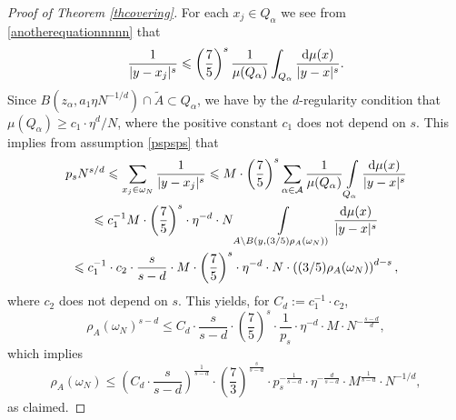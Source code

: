 \documentclass[12pt]{amsart}
\theoremstyle{definition}
\def\sli{\sum\limits}
\def\ili{\int\limits}
\newcommand{\1}{\mathbf{1}}
\begin{document}
\begin{proof}[Proof of Theorem \ref{thcovering}]
For each $x_j\in Q_\alpha$ we see from \eqref{anotherequationnnnn} that
$$
\frac{1}{|y-x_j|^s}\leqslant \left(\frac 75\right)^s\frac{1}{\mu(Q_\alpha)}\int_{Q_\alpha}\frac{\textup{d}\mu(x)}{|y-x|^s}.
$$
Since $B(z_\alpha, a_1\eta N^{-1/d})\cap\tilde{A}\subset Q_\alpha$, we have by the $d$-regularity condition that $\mu(Q_\alpha)\geqslant c_1\cdot \eta^d/N$, where the positive constant $c_1$ does not depend on $s$. This implies from assumption \eqref{pspsps} that
\begin{multline}\label{anothermultlineee}
p_s N^{s/d}\leqslant \sli_{x_j\in \omega_N}\frac{1}{|y-x_j|^s}\leqslant M\cdot \left(\frac 75\right)^s\sli_{\alpha\in \mathcal{A}} \frac{1}{\mu(Q_\alpha)}\ili_{Q_\alpha}\frac{\textup{d}\mu(x)}{|y-x|^s} \\ 
\leqslant c_1^{-1} M\cdot \left(\frac 75\right)^s \cdot \eta^{-d}\cdot N \ili_{A\setminus B(y, (3/5) \rho_A(\omega_N))}\frac{\textup{d}\mu(x)}{|y-x|^s}\\
\leqslant c_1^{-1}\cdot c_2\cdot \frac{s}{s-d}\cdot M\cdot \left(\frac 75\right)^s \cdot \eta^{-d} \cdot N\cdot \left((3/5) \rho_A(\omega_N)\right)^{d-s},
\end{multline}
where $c_2$ does not depend on $s$. This yields, for $C_d:=c_{1}^{-1}\cdot c_2$,
$$
\rho_A(\omega_N)^{s-d}\leqslant C_d \cdot \frac{s}{s-d}\cdot \left(\frac 75\right)^s \cdot \frac1{p_s}\cdot \eta^{-d} \cdot M \cdot N^{-\frac{s-d}d},
$$
which implies
$$
\rho_A(\omega_N)\leqslant \left(C_d \cdot \frac{s}{s-d}\right)^{\frac{1}{s-d}}\cdot \left(\frac 73\right)^{\frac{s}{s-d}} \cdot p_s^{-\frac{1}{s-d}} \cdot \eta^{-\frac{d}{s-d}} \cdot M^{\frac{1}{s-d}} \cdot N^{-1/d},
$$
as claimed.
\end{proof}
\end{document}
